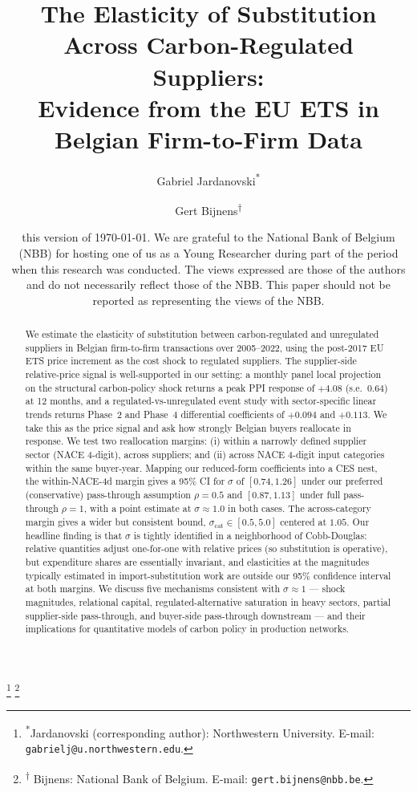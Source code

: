\documentclass[11pt, reqno]{amsart}
\theoremstyle{definition}
\begin{document}
\title[]{The Elasticity of Substitution Across Carbon-Regulated Suppliers:\\ Evidence from the EU ETS in Belgian Firm-to-Firm Data}

\author[]{Gabriel Jardanovski\textsuperscript{*} \and Gert Bijnens\textsuperscript{$\dagger$}}
\thanks{\noindent \textsuperscript{*}Jardanovski (corresponding author): Northwestern University. E-mail: \texttt{gabrielj@u.northwestern.edu}.}
\thanks{\textsuperscript{$\dagger$} Bijnens: National Bank of Belgium. E-mail: \texttt{gert.bijnens@nbb.be}.}

\date{\tiny{\sc this version} of \today. We are grateful to the National Bank of Belgium (NBB) for hosting one of us as a Young Researcher during part of the period when this research was conducted. The views expressed are those of the authors and do not necessarily reflect those of the NBB. This paper should not be reported as representing the views of the NBB.}

\begin{abstract}
We estimate the elasticity of substitution between carbon-regulated and unregulated suppliers in Belgian firm-to-firm transactions over 2005--2022, using the post-2017 EU ETS price increment as the cost shock to regulated suppliers. The supplier-side relative-price signal is well-supported in our setting: a monthly panel local projection on the \citet{kanzig2023unequal} structural carbon-policy shock returns a peak PPI response of $+4.08$ (s.e.\ $0.64$) at 12 months, and a regulated-vs-unregulated event study with sector-specific linear trends returns Phase~2 and Phase~4 differential coefficients of $+0.094$ and $+0.113$. We take this as the price signal and ask how strongly Belgian buyers reallocate in response. We test two reallocation margins: (i) within a narrowly defined supplier sector (NACE 4-digit), across suppliers; and (ii) across NACE 4-digit input categories within the same buyer-year. Mapping our reduced-form coefficients into a CES nest, the within-NACE-4d margin gives a 95\% CI for $\sigma$ of $[0.74, 1.26]$ under our preferred (conservative) pass-through assumption $\rho = 0.5$ and $[0.87, 1.13]$ under full pass-through $\rho = 1$, with a point estimate at $\sigma \approx 1.0$ in both cases. The across-category margin gives a wider but consistent bound, $\sigma_{\text{cat}} \in [0.5, 5.0]$ centered at $1.05$. Our headline finding is that $\sigma$ is tightly identified in a neighborhood of Cobb-Douglas: relative quantities adjust one-for-one with relative prices (so substitution is operative), but expenditure shares are essentially invariant, and elasticities at the magnitudes typically estimated in import-substitution work are outside our 95\% confidence interval at both margins. We discuss five mechanisms consistent with $\sigma \approx 1$ --- shock magnitudes, relational capital, regulated-alternative saturation in heavy sectors, partial supplier-side pass-through, and buyer-side pass-through downstream --- and their implications for quantitative models of carbon policy in production networks.
\end{abstract}
\end{document}
